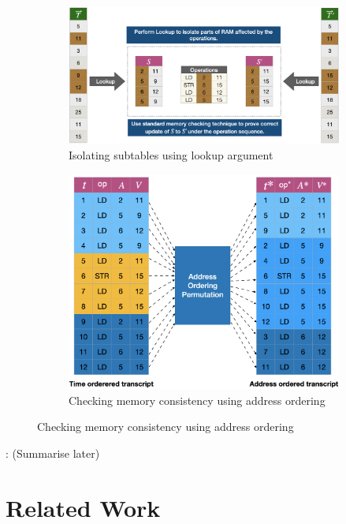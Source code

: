 \documentclass[sigconf]{acmart}
\begin{document}
\begin{figure}[t]
	\begin{subfigure}{0.5\textwidth}
		\centering
		\includegraphics[width=\textwidth]{example-lookup}
		\caption{Isolating subtables using lookup argument}
		\label{fig:subtable-consistency}
	\end{subfigure}
	\begin{subfigure}{0.5\textwidth}
		\centering
		\includegraphics[height=0.3\textheight]{Address-ordered}
		\caption{Checking memory consistency using address ordering}
		\label{fig:permuted-transcripts}
	\end{subfigure}
\end{figure}

%

: (Summarise later)

\section{Related Work}\label{sec:rel-work}
\end{document}
